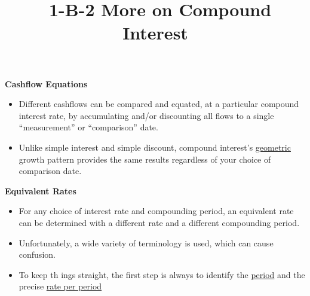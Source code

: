 \documentclass[12pt]{article}
\title{\normalfont\ 1-B-2 More on Compound Interest} %
\author{} %
\date{}  %
\begin{document}
\maketitle %

\vspace{-1in}

\begin{flushleft}
    \textbf{Cashflow Equations}
\end{flushleft}
\vspace{.1in}

\begin{itemize}
    \item Different cashflows can be compared and equated, at a particular compound interest rate, by
          accumulating and/or discounting all flows to a single ``measurement'' or ``comparison'' date.
    \item Unlike simple interest and simple discount, compound interest's \underline{geometric} growth
          pattern provides the same results regardless of your choice of comparison date.
\end{itemize}
\vspace{1.5in}

\begin{flushleft}
    \textbf{Equivalent Rates}
\end{flushleft}
\vspace{.1in}


\begin{itemize}
    \item For any choice of interest rate and compounding period, an equivalent rate can be determined
          with a different rate and a different compounding period.
    \item Unfortunately, a wide variety of terminology is used, which can cause confusion.
    \item To keep th ings straight, the first step is always to identify the \underline{period} and
          the precise \underline{rate per period}
\end{itemize}
\vspace{.1in}


\end{document}
